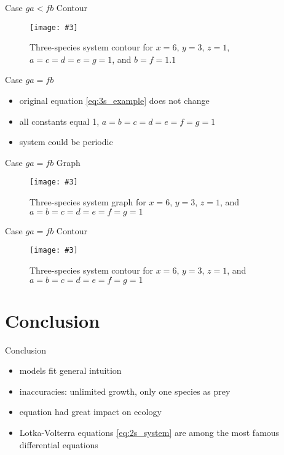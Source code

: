 \documentclass[hyperref={colorlinks,allcolors=black}]{beamer}
\newcommand{\makefig}[4]{
    \begin{figure}[#1]
        \captionsetup{justification=centering}
        \texttt{[image: \#3]}
        \caption{#4}
        \label{fig:#3}
    \end{figure}
}
\begin{document}
\begin{frame}{Case $ga < fb$ Contour}
\makefig{h}{0.65\textwidth}{3s_ga_l_fb_contour}{Three-species system contour for
$x=6$, $y=3$, $z=1$, $a=c=d=e=g=1$, and $b=f=1.1$}
\end{frame}

\begin{frame}{Case $ga=fb$}
\begin{itemize}
\setlength\itemsep{1em}
    \item original equation \eqref{eq:3s_example} does not change
    \item all constants equal 1, $a=b=c=d=e=f=g=1$
    \item system could be periodic
\end{itemize}
\end{frame}

\begin{frame}{Case $ga=fb$ Graph}
\makefig{h}{0.9\textwidth}{3s_ga_eq_fb_graph}{Three-species system graph for
$x=6$, $y=3$, $z=1$, and $a=b=c=d=e=f=g=1$}
\end{frame}

\begin{frame}{Case $ga=fb$ Contour}
\makefig{h}{0.65\textwidth}{3s_ga_eq_fb_contour}{Three-species system contour for
$x=6$, $y=3$, $z=1$, and $a=b=c=d=e=f=g=1$}
\end{frame}


\section{Conclusion}

\begin{frame}{Conclusion}
    \begin{itemize}\setlength\itemsep{1em}
        \item models fit general intuition
        \item inaccuracies: unlimited growth, only one species as prey
        \item equation had great impact on ecology \cite{wangersky}
        \item Lotka-Volterra equations \eqref{eq:2s_system} are among the most
            famous differential equations
    \end{itemize}
\end{frame}

\end{document}
